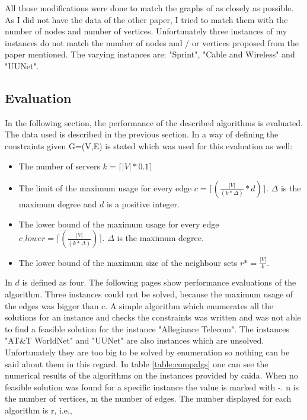 \documentclass [12pt]{article}
\begin{document}
  All those modifications were done to match the graphs of \cite{mirrorserver} as closely as possible.
  As I did not have the data of the other paper, I tried to match them with the number of
  nodes and number of vertices. Unfortunately three instances of my instances do not
  match the number of nodes and / or vertices proposed from the paper mentioned.
  The varying instances are: "Sprint", "Cable and Wireless" and "UUNet".

  \subsection{Evaluation}
  In the following section, the performance of the described algorithms is evaluated. The data used is described in the previous section.
  In \cite{mirrorserver} a way of defining the constraints given G=(V,E) is stated which was used for this evaluation as well: 
  \begin{itemize}
    \item{The number of servers $k = \lceil |V| * 0.1 \rceil$  }
    \item{The limit of the maximum usage for every edge $c = \lceil(\frac{|V|}{(k*\Delta)}*d)\rceil$. $\Delta$ is the maximum degree and $d$ is a positive integer.}
    \item{The lower bound of the maximum usage for every edge $c\_lower = \lceil(\frac{|V|}{(k*\Delta)})\rceil$. $\Delta$ is the maximum degree.}
    \item{The lower bound of the maximum size of the neighbour sets $r*=\frac{|V|}{k}$.}
  \end{itemize}
  In \cite{mirrorserver} $d$ is defined as four. %
  The following pages show performance evaluations of the algorithm.  Three instances could not be solved, because the maximum usage of the 
  edges was bigger than c. A simple algorithm which enumerates all the solutions for an instance and checks the constraints was written and was not able to find a feasible solution 
  for the instance "Allegiance Telecom". The instances  "AT\&T WorldNet" and "UUNet" are also instances which are unsolved. Unfortunately they are too big to be solved by enumeration so
  nothing can be said about them in this regard. In table \ref{table:compalgs} one can see the numerical results of the algorithms on the instances provided by caida. When no
  feasible solution was found for a specific instance the value is marked with -. n is the number of vertices, m the number of edges. The number displayed for each algorithm is r, i.e.,%
\end{document}
